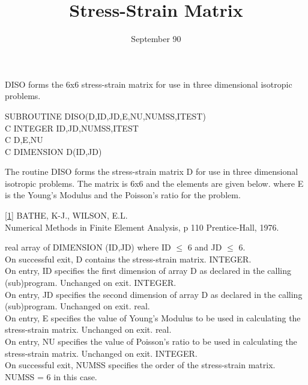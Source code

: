 \date{September 90}
\newcommand{\gt}{>}
\newcommand{\lt}{<}
\title{Stress-Strain Matrix}

\begin{purpose}
DISO forms the 6x6 stress-strain matrix for use in three
dimensional isotropic problems.
\end{purpose}
\begin{specification}
      SUBROUTINE DISO(D,ID,JD,E,NU,NUMSS,ITEST)\\
C     INTEGER ID,JD,NUMSS,ITEST\\
C     \real D,E,NU\\
C     DIMENSION D(ID,JD)\\
\end{specification}
\begin{description}
The routine DISO forms the stress-strain matrix D for use
in three dimensional isotropic problems. The matrix is 6x6
and the elements are given below.
where E is the Young's Modulus and   the Poisson's ratio for
the problem.
\end{description}
\begin{references}
\ref{1} BATHE, K-J., WILSON, E.L.\\
      Numerical Methods in Finite Element Analysis, p 110
      Prentice-Hall, 1976.
\end{references}
\begin{parameters}
 {{real}} array of DIMENSION (ID,JD) where ID $\leq$ 6 and JD $\leq$ 6.\\
      On successful exit, D contains the stress-strain matrix.
 INTEGER.\\
      On entry, ID specifies the first dimension of array D as
      declared in the calling (sub)program.
      Unchanged on exit.
 INTEGER.\\
      On entry, JD specifies the second dimension of array D as
      declared in the calling (sub)program.
      Unchanged on exit.
 {{real}}.\\
      On entry, E specifies the value of Young's Modulus to be
      used in calculating the stress-strain matrix.
      Unchanged on exit.
 {{real}}.\\
      On entry, NU specifies the value of Poisson's ratio to be
      used in calculating the stress-strain matrix.
      Unchanged on exit.
 INTEGER.\\
      On successful exit, NUMSS specifies the order of the
      stress-strain matrix. NUMSS = 6 in this case.

\end{parameters}
